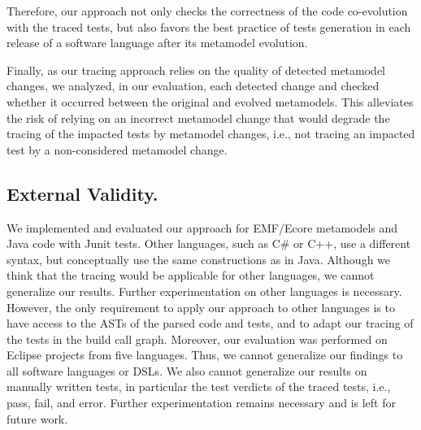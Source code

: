 Therefore, our approach not only checks the correctness of the code co-evolution with the traced tests, but also favors the best practice of tests generation in each release of a software language after its metamodel evolution.

Finally, as our tracing approach relies on the quality of detected metamodel changes, we analyzed, in our evaluation, each detected change and checked whether it occurred between the original and evolved metamodels. This alleviates the risk of relying on an incorrect metamodel change that would degrade the tracing of the impacted tests by metamodel changes, i.e., not tracing an impacted test by a non-considered metamodel change. 

\subsection{External Validity.} 
We implemented and evaluated our approach for EMF/Ecore metamodels and Java code with Junit tests. Other languages, such as C\# or C++, use a different syntax, but conceptually use the same constructions as in Java.
Although we think that the tracing would be applicable for other languages, we cannot generalize our results. Further experimentation on other languages is necessary. However, the only requirement to apply our approach to other languages is to have access to the ASTs of the parsed code and tests, and to adapt our tracing of the tests in the build call graph. 
%
Moreover, our evaluation was performed on Eclipse projects from five languages. Thus, we cannot generalize our findings to all software languages or DSLs. We also cannot generalize our results on manually written tests, in particular the test verdicts of the traced tests, i.e., pass, fail, and error. Further experimentation remains necessary and is left for future work. 

